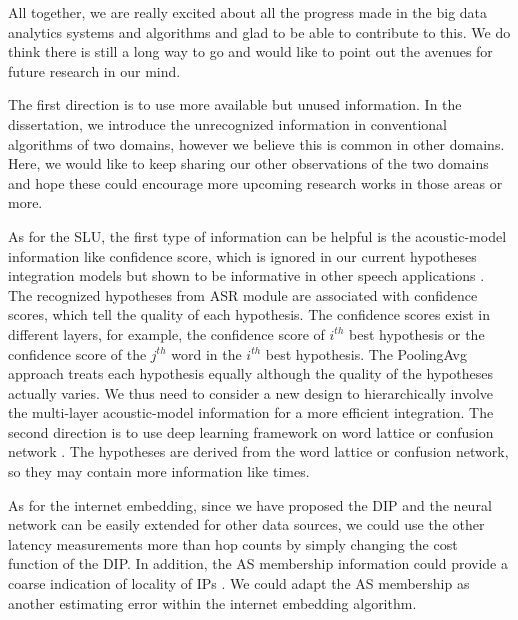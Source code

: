 \documentclass [PhD] {uclathes}
\begin{document}
All together, we are really excited about all the progress made in the big data analytics systems and algorithms  and glad to be able to contribute to this. We do think there is still a long way to go and would like to point out the avenues for future research in our mind.

The first direction is to use more available but unused information.  In the dissertation, we introduce the unrecognized information in conventional algorithms of two domains, however we believe this is common in other domains. Here, we would like to keep sharing our other observations of  the two domains  and hope these could encourage more upcoming research works in those areas or more. 
 
As for the SLU, the first type of information can be helpful is the acoustic-model information like confidence score, which is ignored in our current hypotheses integration models but shown to be informative in other speech applications \citep{kumar2014normalization, fiscus1997post}. The recognized hypotheses from ASR module are associated with confidence scores, which tell the quality of each hypothesis. The confidence scores exist in different  layers, for example, the  confidence score of $i^{th}$ best hypothesis or the  confidence score of the $j^{th}$ word in the $i^{th}$ best hypothesis. The PoolingAvg approach treats each hypothesis equally although the quality of the hypotheses actually varies. We thus need to consider a new design to hierarchically involve the multi-layer acoustic-model information for a more efficient integration. The second direction is to use deep learning framework on word lattice \citep{liu2014efficient} or confusion network \citep{hakkani2006beyond, tur2002improving}. The hypotheses are derived from the word lattice or confusion network, so they may contain more information like times.  

As for the internet embedding, since we have proposed the DIP and the neural network can be easily extended for other data sources, we could use the other latency measurements \citep{vivaldi} more than hop counts by simply changing the cost function of the DIP.  In addition, the AS membership information could provide a coarse indication of locality of IPs \citep{barford-infocom}. We could adapt the AS membership as another estimating error within the internet embedding algorithm.
\end{document}
